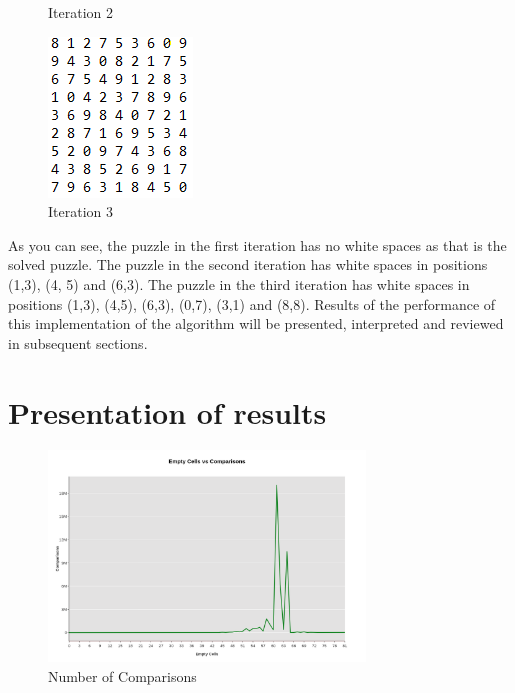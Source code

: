 \documentclass{article}
\begin{document}
\begin{figure}[!htb]
      \caption{Iteration 2}\label{fig:awesome_image2}
    \endminipage\hfill
      \includegraphics[width=\linewidth]{iteration3.png}
      \caption{Iteration 3}\label{fig:awesome_image3}
    \endminipage
    \end{figure}


    As you can see, the puzzle in the first iteration has no white spaces as that is the solved puzzle. The puzzle in the second iteration has white spaces in positions (1,3), (4, 5) and (6,3). The puzzle in the third iteration has white spaces in positions (1,3), (4,5), (6,3), (0,7), (3,1) and (8,8). Results of the performance of this implementation of the algorithm will be presented, interpreted and reviewed in subsequent sections.
     
    \pagebreak 
    \section{Presentation of results}
    \begin{figure}[h]
        \centering
        \includegraphics[width=0.75\textwidth]{Comparisons.png}
        \caption{Number of Comparisons}
    \end{figure}
    
\end{document}
